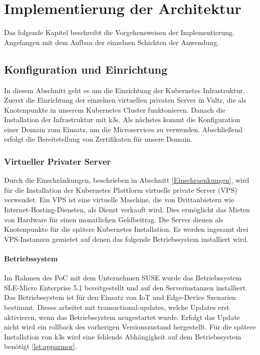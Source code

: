 \chapter{Implementierung der Architektur}

Das folgende Kapitel beschreibt die Vorgehensweisen der Implementierung.
Angefangen mit dem Aufbau der einzelnen Schichten der Anwendung.


\section{Konfiguration und Einrichtung}

In diesem Abschnitt geht es um die Einrichtung der Kubernetes Infrastruktur.
Zuerst die Einrichtung der einzelnen virtuellen privaten Server in Vultr, die als Knotenpunkte in unserem Kubernetes Cluster funktonieren.
Danach die Installation der Infrastruktur mit k3s.
Als nächstes kommt die Konfiguration einer Domain zum Einsatz, um die Microservices zu verwenden.
Abschließend erfolgt die Bereitstellung von Zertifikaten für unsere Domain.

\subsection{Virtueller Privater Server}

Durch die Einschränkungen, beschrieben in Abschnitt \ref{Einschraenkungen},
wird für die Installation der Kubernetes Plattform virtuelle private Server (VPS) verwendet.
Ein VPS ist eine virtuelle Maschine, die von Drittanbietern wie Internet-Hosting-Diensten, als Dienst verkauft wird.
Dies ermöglicht das Mieten von Hardware für einen monatlichen Geldbeitrag.
Die Server dienen als Knotenpunkte für die spätere Kubernetes Installation.
Es werden ingesamt drei VPS-Instanzen gemietet auf denen das folgende Betriebssystem installiert wird.

\subsubsection{Betriebssystem}
Im Rahmen des PoC mit dem Unternehmen SUSE wurde das 
Betriebssystem SLE-Micro Enterprise 5.1 bereitgestellt und auf den Serverinstanzen installiert.
Das Betriebssystem ist für den Einsatz von IoT und Edge-Device Szenarien bestimmt.
Dieses arbeitet mit transactional-updates, welche Updates erst aktivieren, wenn das Betriebssystem neugestartet wurde. 
Erfolgt das Update nicht wird ein rollback des vorherigen Versionszustand hergestellt.
Für die spätere Installation von k3s wird eine fehlende Abhängigkeit auf dem Betriebssystem benötigt \ref{lst:apparmor}.

